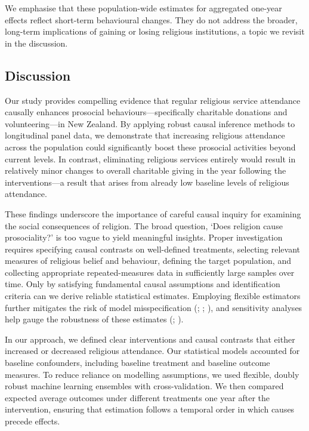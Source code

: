 \documentclass[
  single column]{article}
\begin{document}
We emphasise that these population-wide estimates for aggregated
one-year effects reflect short-term behavioural changes. They do not
address the broader, long-term implications of gaining or losing
religious institutions, a topic we revisit in the discussion.

\subsection{Discussion}\label{discussion}

Our study provides compelling evidence that regular religious service
attendance causally enhances prosocial behaviours---specifically
charitable donations and volunteering---in New Zealand. By applying
robust causal inference methods to longitudinal panel data, we
demonstrate that increasing religious attendance across the population
could significantly boost these prosocial activities beyond current
levels. In contrast, eliminating religious services entirely would
result in relatively minor changes to overall charitable giving in the
year following the interventions---a result that arises from already low
baseline levels of religious attendance.

These findings underscore the importance of careful causal inquiry for
examining the social consequences of religion. The broad question, `Does
religion cause prosociality?' is too vague to yield meaningful insights.
Proper investigation requires specifying causal contrasts on
well-defined treatments, selecting relevant measures of religious belief
and behaviour, defining the target population, and collecting
appropriate repeated-measures data in sufficiently large samples over
time. Only by satisfying fundamental causal assumptions and
identification criteria can we derive reliable statistical estimates.
Employing flexible estimators further mitigates the risk of model
misspecification (; ;
), and sensitivity
analyses help gauge the robustness of these estimates
(;
).

In our approach, we defined clear interventions and causal contrasts
that either increased or decreased religious attendance. Our statistical
models accounted for baseline confounders, including baseline treatment
and baseline outcome measures. To reduce reliance on modelling
assumptions, we used flexible, doubly robust machine learning ensembles
with cross-validation. We then compared expected average outcomes under
different treatments one year after the intervention, ensuring that
estimation follows a temporal order in which causes precede effects.
\end{document}
